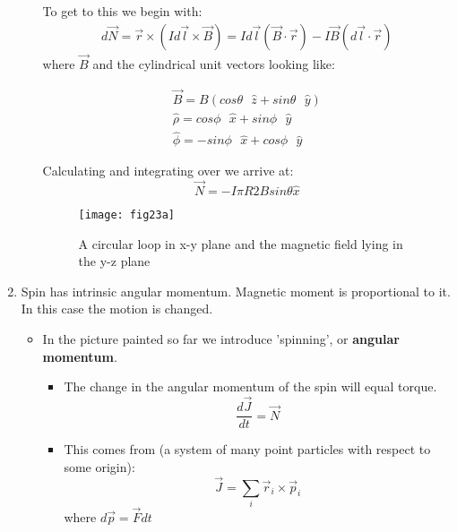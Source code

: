 \begin{enumerate}
\begin{itemize}
        To get to this we begin with: 
        \begin{align}
            d\vec{N} = \vec{r} \times (Id\vec{l} \times \vec{B}) = Id\vec{l}(\vec{B} \cdot \vec{r}) - I \vec{B} (d\vec{l} \cdot \vec{r})
        \end{align}
        where $\vec{B}$ and the cylindrical unit vectors looking like:
        
        \begin{align}
            \vec{B} = B(cos \theta \text{ } \hat{z} + sin \theta \text{ } \hat{y}) \\
            \hat{\rho} = cos \phi \text{ } \hat{x} + sin \phi \text{ } \hat{y} \\
            \hat{\phi} = - sin \phi \text{ } \hat{x} + cos \phi \text{ } \hat{y}
        \end{align}
        
        Calculating and integrating over we arrive at:
        \begin{equation} \label{eq:eq29}
            \vec{N} = − I \pi R 2 B sin\theta \hat{x}
        \end{equation}

        \begin{figure}[H]
            \centering
            \texttt{[image: fig23a]}
            \caption{ A circular loop in x-y plane and the magnetic field lying in the y-z plane
            } 
            \label{fig:fig23a}
        \end{figure}

    \end{itemize}

    \item Spin has intrinsic angular momentum. Magnetic moment is proportional to it. In this case the motion is changed.
    \begin{itemize}
        \item In the picture painted so far we introduce 'spinning', or \textbf{angular momentum}.

        \begin{itemize}
            \item The change in the angular momentum of the spin will equal torque.
            \begin{equation} \label{eq:eq214}
                \frac{d\vec{J}}{dt} = \vec{N}
            \end{equation}
            
            \item This comes from (a system of many point particles with respect to some origin):
            \begin{equation} \label{eq:eq215}
                \vec{J} = \sum_i \vec{r}_i \times \vec{p}_i
            \end{equation}
            where $d\vec{p} = \vec{F} dt$
            

\end{itemize}
\end{itemize}
\end{enumerate}
